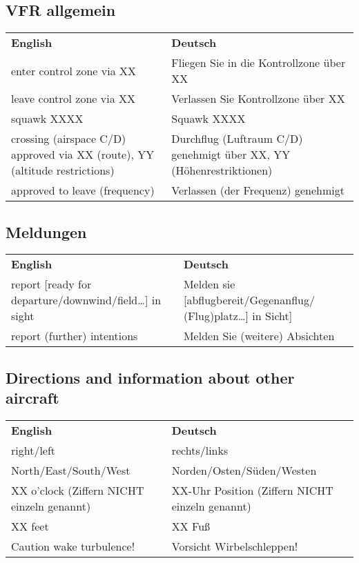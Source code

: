 
\subsection{VFR allgemein}
\begin{table}[H]
	\begin{tabularx}{\textwidth}{XX}
		\textbf{English} & \textbf{Deutsch} \\
		enter control zone via XX     & Fliegen Sie in die Kontrollzone über XX \\
		leave control zone via XX     & Verlassen Sie Kontrollzone über XX      \\
		squawk XXXX                   & Squawk XXXX                             \\
		crossing (airspace C/D) approved via XX (route), YY (altitude restrictions) & Durchflug (Luftraum C/D) genehmigt über XX, YY (Höhenrestriktionen) \\
		approved to leave (frequency) & Verlassen (der Frequenz) genehmigt     
	\end{tabularx}%
\end{table}

\subsection{Meldungen}
\begin{table}[H]
	\begin{tabularx}{\textwidth}{XX}
		\textbf{English} & \textbf{Deutsch} \\
		report {[}ready for departure/downwind/field…{]} in sight & Melden sie {[}abflugbereit/Gegenanflug/ (Flug)platz…{]} in Sicht{]} \\
		report (further) intentions                               & Melden Sie (weitere) Absichten                                     
	\end{tabularx}%
\end{table}

\subsection{Directions and information about other aircraft}
\begin{table}[H]
	\begin{tabularx}{\textwidth}{XX}
		\textbf{English} & \textbf{Deutsch} \\
		right/left               & rechts/links              \\
		North/East/South/West    & Norden/Osten/Süden/Westen \\
		XX o'clock (Ziffern NICHT einzeln genannt) & XX-Uhr Position (Ziffern NICHT einzeln genannt) \\
		XX feet                  & XX Fuß                    \\
		Caution wake turbulence! & Vorsicht Wirbelschleppen!
	\end{tabularx}%
\end{table}


